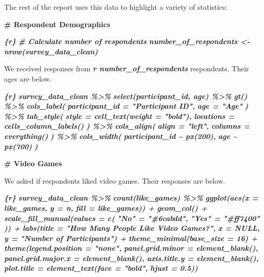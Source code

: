\documentclass[
]{book}
\newenvironment{Shaded}{\begin{snugshade}}{\end{snugshade}}
\newcommand{\FunctionTok}[1]{\textcolor[rgb]{0.13,0.29,0.53}{\textbf{#1}}}
\newcommand{\InformationTok}[1]{\textcolor[rgb]{0.56,0.35,0.01}{\textbf{\textit{#1}}}}
\newcommand{\NormalTok}[1]{#1}
\begin{document}
The rest of the report uses this data to highlight a variety of statistics:

\begin{Shaded}
\begin{Highlighting}[]
\FunctionTok{\# Respondent Demographics}

\InformationTok{\textasciigrave{}\textasciigrave{}\textasciigrave{}\{r\}}
\InformationTok{\# Calculate number of respondents}
\InformationTok{number\_of\_respondents \textless{}{-} nrow(survey\_data\_clean)}
\InformationTok{\textasciigrave{}\textasciigrave{}\textasciigrave{}}

\NormalTok{We received responses from }\InformationTok{\textasciigrave{}r number\_of\_respondents\textasciigrave{}}\NormalTok{ respondents. Their ages are below.}

\InformationTok{\textasciigrave{}\textasciigrave{}\textasciigrave{}\{r\}}
\InformationTok{survey\_data\_clean \%\textgreater{}\% }
\InformationTok{  select(participant\_id, age) \%\textgreater{}\% }
\InformationTok{  gt() \%\textgreater{}\% }
\InformationTok{  cols\_label(}
\InformationTok{    participant\_id = "Participant ID",}
\InformationTok{    age = "Age"}
\InformationTok{  ) \%\textgreater{}\% }
\InformationTok{  tab\_style(}
\InformationTok{    style = cell\_text(weight = "bold"),}
\InformationTok{    locations = cells\_column\_labels()}
\InformationTok{  ) \%\textgreater{}\% }
\InformationTok{  cols\_align(}
\InformationTok{    align = "left",}
\InformationTok{    columns = everything()}
\InformationTok{  ) \%\textgreater{}\% }
\InformationTok{  cols\_width(}
\InformationTok{    participant\_id \textasciitilde{} px(200),}
\InformationTok{    age \textasciitilde{} px(700)}
\InformationTok{  ) }
\InformationTok{\textasciigrave{}\textasciigrave{}\textasciigrave{}}

\FunctionTok{\# Video Games}

\NormalTok{We asked if respondents liked video games. Their responses are below.}

\InformationTok{\textasciigrave{}\textasciigrave{}\textasciigrave{}\{r\}}
\InformationTok{survey\_data\_clean \%\textgreater{}\%}
\InformationTok{  count(like\_games) \%\textgreater{}\% }
\InformationTok{  ggplot(aes(x = like\_games,}
\InformationTok{             y = n,}
\InformationTok{             fill = like\_games)) +}
\InformationTok{  geom\_col() +}
\InformationTok{  scale\_fill\_manual(values = c(}
\InformationTok{    "No" = "\#6cabdd",}
\InformationTok{    "Yes" = "\#ff7400"}
\InformationTok{  )) +}
\InformationTok{  labs(title = "How Many People Like Video Games?", }
\InformationTok{       x = NULL,}
\InformationTok{       y = "Number of Participants") +}
\InformationTok{  theme\_minimal(base\_size = 16) +}
\InformationTok{  theme(legend.position = "none",}
\InformationTok{        panel.grid.minor = element\_blank(),}
\InformationTok{        panel.grid.major.x = element\_blank(),}
\InformationTok{        axis.title.y = element\_blank(),}
\InformationTok{        plot.title = element\_text(face = "bold",}
\InformationTok{                                  hjust = 0.5))}
\InformationTok{\textasciigrave{}\textasciigrave{}\textasciigrave{}}
\end{Highlighting}
\end{Shaded}
\end{document}
